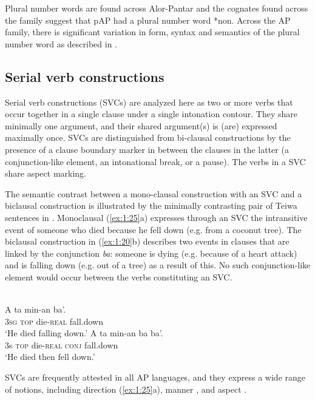 {Plural number words are found across Alor-Pantar and the cognates found across the family suggest that pAP had a plural number word *non. Across the AP family, there is significant variation in form, syntax and semantics of the plural number word as described in \citet{KlamerEtAlTV}. 

\subsection{Serial verb constructions}\label{sec:1:5.5}
Serial verb constructions (SVCs) are analyzed here as two or more verbs that occur together in a single clause under a single intonation contour. They share minimally one argument, and their shared argument(s) is (are) expressed maximally once. SVCs are distinguished from bi-clausal constructions by the presence of a clause boundary marker in between the clauses in the latter (a conjunction-like element, an intonational break, or a pause). The verbs in a SVC share aspect marking. 

The semantic contrast between a mono-clausal construction with an SVC and a biclausal construction is illustrated by the minimally contrasting pair of Teiwa sentences in . Monoclausal (\ref{ex:1:25}a) expresses through an SVC the intransitive event of someone who died because he fell down (e.g. from a coconut tree). The biclausal construction in (\ref{ex:1:20}b) describes two events in clauses that are linked by the conjunction \textit{ba}: someone is dying (e.g. because of a heart attack) and is falling down (e.g. out of a tree) as a result of this. No such conjunction-like element would occur between the verbs constituting an SVC.



\ea%
\label{ex:1:25}
 \\
\ea
\gll A  ta  min-an  ba'. \\
 3\textsc{sg}  \textsc{top}  die-\textsc{real}  fall.down    \\
\glt `He died falling down.' 
\ex
\gll A  ta  min-an  ba  ba'.  \\
 3s  \textsc{top}  die-\textsc{real}  \textsc{conj} fall.down    \\
\glt `He died then fell down.' 
\z 
\z 
 


SVCs are frequently attested in all AP languages, and they express a wide range of notions, including direction (\ref{ex:1:25}a), manner , and aspect . 



}
